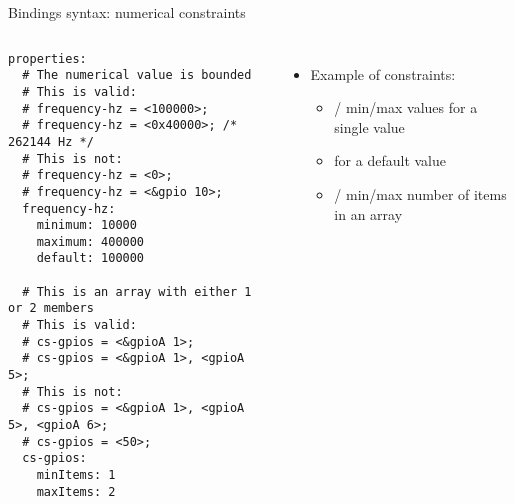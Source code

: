 \begin{frame}[fragile]{Bindings syntax: numerical constraints}
  \begin{columns}
    \begin{block}{}
      {\fontsize{5}{6}\selectfont
\begin{verbatim}
properties:
  # The numerical value is bounded
  # This is valid:
  # frequency-hz = <100000>;
  # frequency-hz = <0x40000>; /* 262144 Hz */
  # This is not:
  # frequency-hz = <0>;
  # frequency-hz = <&gpio 10>;
  frequency-hz:
    minimum: 10000
    maximum: 400000
    default: 100000

  # This is an array with either 1 or 2 members
  # This is valid:
  # cs-gpios = <&gpioA 1>;
  # cs-gpios = <&gpioA 1>, <gpioA 5>;
  # This is not:
  # cs-gpios = <&gpioA 1>, <gpioA 5>, <gpioA 6>;
  # cs-gpios = <50>;
  cs-gpios:
    minItems: 1
    maxItems: 2
\end{verbatim}
      }
    \end{block}
    \begin{itemize}
    \item Example of constraints:
      \begin{itemize}
      \item {}/ min/max values for a
        single value
      \item {} for a default value
      \item {}/ min/max number of
        items in an array
      \end{itemize}
    \end{itemize}
  \end{columns}
\end{frame}

